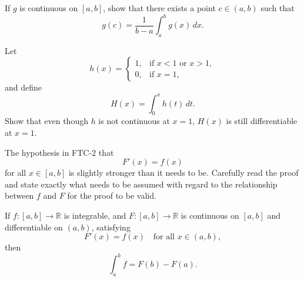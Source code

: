 \documentclass[12pt,a4paper]{article}
\begin{document}
\clearpage

\begin{theorem}
If \(g\) is continuous on \([a,b]\), show that there exists a point
\(
c\in(a,b)
\)
such that
\[
g(c)=\frac{1}{b-a}\int_a^b g(x)\,dx.
\]
\end{theorem}

\clearpage

\begin{theorem}
Let
\[
h(x)=
\begin{cases}
1, & \text{if } x<1 \text{ or } x>1,\\
0, & \text{if } x=1,
\end{cases}
\]
and define
\[
H(x)=\int_0^x h(t)\,dt.
\]
Show that even though \(h\) is not continuous at \(x=1\), \(H(x)\) is still differentiable at \(x=1\).
\end{theorem}

\clearpage

\begin{theorem}
The hypothesis in FTC-2 that
\[
F'(x)=f(x)
\]
for all \(x\in[a,b]\) is slightly stronger than it needs to be. Carefully read the proof and state exactly what needs to be assumed with regard to the relationship between \(f\) and \(F\) for the proof to be valid.
\end{theorem}

\clearpage

\begin{theorem}
    If \(f:[a,b]\to\mathbb{R}\) is integrable, and
\(F:[a,b]\to\mathbb{R}\) is continuous on $[a,b]$ and differentiable on $(a,b)$, satisfying
\[
F'(x)=f(x) \quad \text{for all } x\in(a,b),
\]
then
\[
\int_a^b f = F(b)-F(a).
\]
\end{theorem}



\EndPage
\end{document}
